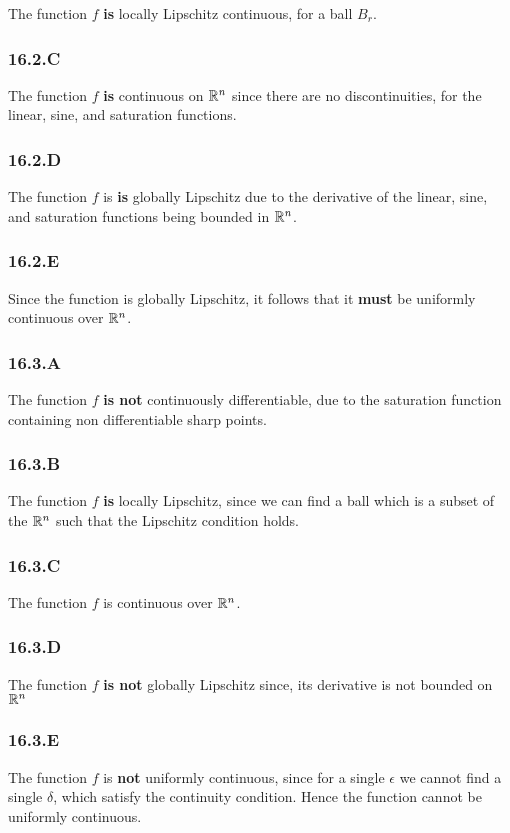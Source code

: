 The function $f$ \textbf{is} locally Lipschitz continuous, for a ball $B_r$.

\subsubsection*{16.2.C}

The function $f$ \textbf{is} continuous on $\mathbb{R}^n$ since there are no discontinuities, for the linear, sine, and saturation functions.

\subsubsection*{16.2.D}

The function $f$ is \textbf{is} globally Lipschitz due to the derivative of the linear, sine, and saturation functions being bounded in $\mathbb{R}^n$.

\subsubsection*{16.2.E}
Since the function is globally Lipschitz, it follows that it \textbf{must} be uniformly continuous over $\mathbb{R}^n$.


\subsubsection*{16.3.A}

The function $f$ \textbf{is not} continuously differentiable, due to the saturation function containing non differentiable sharp points.

\subsubsection*{16.3.B}

The function $f$ \textbf{is} locally Lipschitz, since we can find a ball which is a subset of the $\mathbb{R}^n$ such that the Lipschitz condition holds.
\subsubsection*{16.3.C}

The function $f$ is continuous over $\mathbb{R}^n$.
\subsubsection*{16.3.D}

The function $f$ \textbf{is not} globally Lipschitz since, its derivative is not bounded on $\mathbb{R}^n$
\subsubsection*{16.3.E}

The function $f$ is \textbf{not} uniformly continuous, since for a single $\epsilon$ we cannot find a single $\delta$, which satisfy the continuity condition. Hence the function cannot be uniformly continuous.

